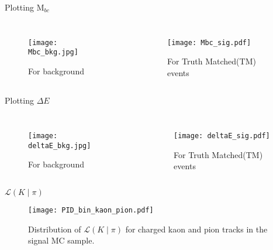 \documentclass[12pt]{beamer}
\begin{document}
\begin{frame}[t]{Plotting M$_{bc}$}
\begin{scriptsize}
			\begin{columns}
		\begin{figure}
			\texttt{[image: Mbc\_bkg.jpg]}
			\caption{For background}
		\end{figure}
		
		\begin{figure}
			\texttt{[image: Mbc\_sig.pdf]}
			\caption{For Truth Matched(TM) events}
		\end{figure}
		
	\end{columns}
\end{scriptsize}
\end{frame}

\begin{frame}[t]{Plotting $\Delta E$}
	\begin{scriptsize}
		\begin{columns}
			\column{0.5\textwidth}
			\begin{figure}
				\texttt{[image: deltaE\_bkg.jpg]}
				\caption{For background}
			\end{figure}
			
			\column{0.5\textwidth}
			\begin{figure}
				\texttt{[image: deltaE\_sig.pdf]}
				\caption{For Truth Matched(TM) events}
			\end{figure}
			
		\end{columns}
	\end{scriptsize}
\end{frame}

\begin{frame}{$\mathcal{L}(K \mid \pi)$}                                                                           
	\begin{figure}
		\centering
		\texttt{[image: PID\_bin\_kaon\_pion.pdf]}
		\caption{Distribution of $\mathcal{L}(K \mid \pi)$ for charged kaon and pion tracks in the signal MC sample.}
		\label{fig:binary_pid_kpi}
	\end{figure}
\end{frame}
\end{document}
